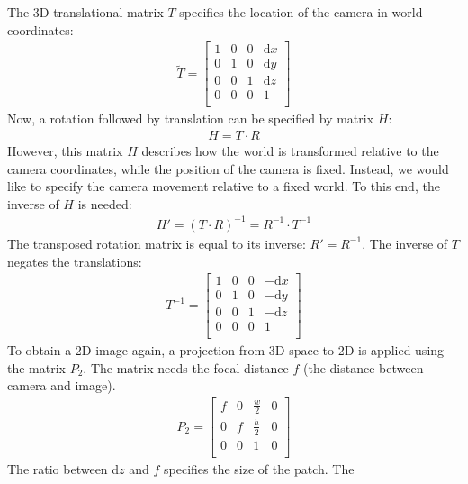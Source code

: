 \documentclass[11pt]{report}
\begin{document}
  The 3D translational matrix $T$ specifies the location of the camera
  in world coordinates:
\begin{align*}
  \tilde{T} = \begin{bmatrix}
    1 & 0 & 0 & \text{d}x        \\
    0 & 1 & 0 & \text{d}y        \\
    0 & 0 & 1 & \text{d}z        \\
    0 & 0 & 0 & 1        \\
  \end{bmatrix}
\end{align*}
Now, a rotation followed by translation can be specified by matrix
$H$:
\begin{align*}
  H = T \cdot R
\end{align*}
However, this matrix $H$ describes how the world is transformed
relative to the camera coordinates, while the position of the camera
is fixed. Instead, we would like to specify the camera movement
relative to a fixed world. To this end, the inverse of $H$ is needed:
\begin{align*}
  H' = (T \cdot R)^{-1} = R^{-1} \cdot T^{-1}
\end{align*}
The transposed rotation matrix is equal to its inverse: $R' =
R^{-1}$. The inverse of $T$ negates the translations:
\begin{align*}
  T^{-1} = \begin{bmatrix}
  1 & 0 & 0 & -\text{d}x        \\
  0 & 1 & 0 & -\text{d}y        \\
  0 & 0 & 1 & -\text{d}z        \\
  0 & 0 & 0 & 1        \\
  \end{bmatrix}
\end{align*}
To obtain a 2D image again, a projection from 3D space to 2D is
applied using the matrix $P_2$. The matrix needs the focal distance
$f$ (the distance between camera and image).
\begin{align*}
    P_2 = 
  \begin{bmatrix}
              f     & 0 & \frac{w}{2} & 0       \\
              0     & f & \frac{h}{2} & 0       \\
              0     & 0 & 1           & 0       \\
  \end{bmatrix}
\end{align*}
The ratio between d$z$ and $f$ specifies the size of the patch. The
\end{document}
